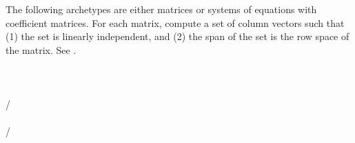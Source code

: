 The following archetypes are either matrices or systems of equations with coefficient matrices.  For each matrix, compute a set of column vectors such that  (1) the set is linearly independent, and (2) the span of the set is the row space of the matrix.  See .\\
\\ 
\\ 
\\ 
/\\ 
\\ 
/\\ 
\\
\\
%
\\
\\


